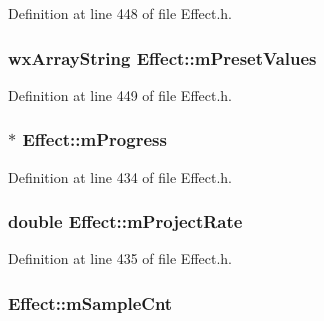 Definition at line 448 of file Effect.\+h.

\subsubsection[{\texorpdfstring{m\+Preset\+Values}{mPresetValues}}]{\setlength{\rightskip}{0pt plus 5cm}wx\+Array\+String Effect\+::m\+Preset\+Values\hspace{0.3cm}{\ttfamily [protected]}}\hypertarget{class_effect_a2ba4bbc029cb6800d63baccb0036999b}{}\label{class_effect_a2ba4bbc029cb6800d63baccb0036999b}


Definition at line 449 of file Effect.\+h.

\subsubsection[{\texorpdfstring{m\+Progress}{mProgress}}]{$\ast$ Effect\+::m\+Progress\hspace{0.3cm}{\ttfamily [protected]}}\hypertarget{class_effect_aeb6d0833a07fef3f399dfca890ca76ec}{}\label{class_effect_aeb6d0833a07fef3f399dfca890ca76ec}


Definition at line 434 of file Effect.\+h.

\subsubsection[{\texorpdfstring{m\+Project\+Rate}{mProjectRate}}]{\setlength{\rightskip}{0pt plus 5cm}double Effect\+::m\+Project\+Rate\hspace{0.3cm}{\ttfamily [protected]}}\hypertarget{class_effect_a31a15690d58a1414e1aaa52682098f1b}{}\label{class_effect_a31a15690d58a1414e1aaa52682098f1b}


Definition at line 435 of file Effect.\+h.

\subsubsection[{\texorpdfstring{m\+Sample\+Cnt}{mSampleCnt}}]{ Effect\+::m\+Sample\+Cnt\hspace{0.3cm}{\ttfamily [protected]}}\hypertarget{class_effect_adae7f004efce71bcfe0f120f27ec6faf}{}\label{class_effect_adae7f004efce71bcfe0f120f27ec6faf}


